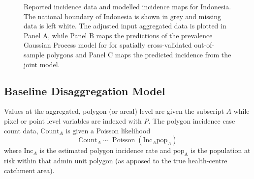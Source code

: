 \documentclass{statsoc}
\begin{document}
\begin{figure}[h!]
\caption{\label{predobsmapidn}
Reported incidence data and modelled incidence maps for Indonesia. 
The national boundary of Indonesia is shown in grey and missing data is left white.
The adjusted input aggregated data is plotted in Panel A, while Panel B maps the predictions of the prevalence Gaussian Process model for for spatially cross-validated out-of-sample polygons and Panel C maps the predicted incidence from the joint model.
}
\end{figure}



\subsection*{Baseline Disaggregation Model}

Values at the aggregated, polygon (or areal) level are given the subscript $A$ while pixel or point level variables are indexed with $P$.
The polygon incidence case count data, $\mathrm{Count}_A$ is given a Poisson likelihood
$$\mathrm{Count}_A \sim \operatorname{Poisson}(\mathrm{Inc}_A\mathrm{pop}_A)$$
where $\mathrm{Inc}_A$ is the estimated polygon incidence rate and $\mathrm{pop_A}$ is the population at risk within that admin unit polygon (as apposed to the true health-centre catchment area).
\end{document}
